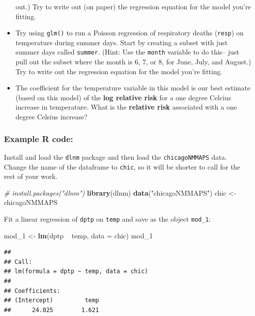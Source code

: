 \documentclass[]{book}
\makeatletter
\newenvironment{Shaded}{\begin{snugshade}}{\end{snugshade}}
\newcommand{\KeywordTok}[1]{\textcolor[rgb]{0.13,0.29,0.53}{\textbf{{#1}}}}
\newcommand{\DataTypeTok}[1]{\textcolor[rgb]{0.13,0.29,0.53}{{#1}}}
\newcommand{\StringTok}[1]{\textcolor[rgb]{0.31,0.60,0.02}{{#1}}}
\newcommand{\CommentTok}[1]{\textcolor[rgb]{0.56,0.35,0.01}{\textit{{#1}}}}
\newcommand{\NormalTok}[1]{{#1}}
\newenvironment{kframe}{%
\medskip{}
\setlength{\fboxsep}{.8em}
 \def\at@end@of@kframe{}%
 \ifinner\ifhmode%
  \def\at@end@of@kframe{\end{minipage}}%
  \begin{minipage}{\columnwidth}%
 \fi\fi%
 \def\FrameCommand##1{\hskip\@totalleftmargin \hskip-\fboxsep
 \colorbox{shadecolor}{##1}\hskip-\fboxsep
     \hskip-\linewidth \hskip-\@totalleftmargin \hskip\columnwidth}%
 \MakeFramed {\advance\hsize-\width
   \@totalleftmargin\z@ \linewidth\hsize
   \@setminipage}}%
 {\par\unskip\endMakeFramed%
 \at@end@of@kframe}
\renewenvironment{Shaded}{\begin{kframe}}{\end{kframe}}
\makeatother
\begin{document}
\begin{itemize}
  out.) Try to write out (on paper) the regression equation for the
  model you're fitting.
\item
  Try using \texttt{glm()} to run a Poisson regression of respiratory
  deaths (\texttt{resp}) on temperature during summer days. Start by
  creating a subset with just summer days called \texttt{summer}. (Hint:
  Use the \texttt{month} variable to do this-- just pull out the subset
  where the month is 6, 7, or 8, for June, July, and August.) Try to
  write out the regression equation for the model you're fitting.
\item
  The coefficient for the temperature variable in this model is our best
  estimate (based on this model) of the \textbf{log relative risk} for a
  one degree Celcius increase in temperature. What is the
  \textbf{relative risk} associated with a one degree Celsius increase?
\end{itemize}

\subsubsection{Example R code:}\label{example-r-code-3}

Install and load the \texttt{dlnm} package and then load the
\texttt{chicagoNMMAPS} data. Change the name of the dataframe to
\texttt{chic}, so it will be shorter to call for the rest of your work.

\begin{Shaded}
\begin{Highlighting}[]
\CommentTok{# install.packages("dlnm")}
\KeywordTok{library}\NormalTok{(dlnm)}
\KeywordTok{data}\NormalTok{(}\StringTok{"chicagoNMMAPS"}\NormalTok{)}
\NormalTok{chic <-}\StringTok{ }\NormalTok{chicagoNMMAPS}
\end{Highlighting}
\end{Shaded}

Fit a linear regression of \texttt{dptp} on \texttt{temp} and save as
the object \texttt{mod\_1}:

\begin{Shaded}
\begin{Highlighting}[]
\NormalTok{mod_1 <-}\StringTok{ }\KeywordTok{lm}\NormalTok{(dptp ~}\StringTok{ }\NormalTok{temp, }\DataTypeTok{data =} \NormalTok{chic)}
\NormalTok{mod_1}
\end{Highlighting}
\end{Shaded}

\begin{verbatim}
## 
## Call:
## lm(formula = dptp ~ temp, data = chic)
## 
## Coefficients:
## (Intercept)         temp  
##      24.025        1.621
\end{verbatim}
\end{document}
